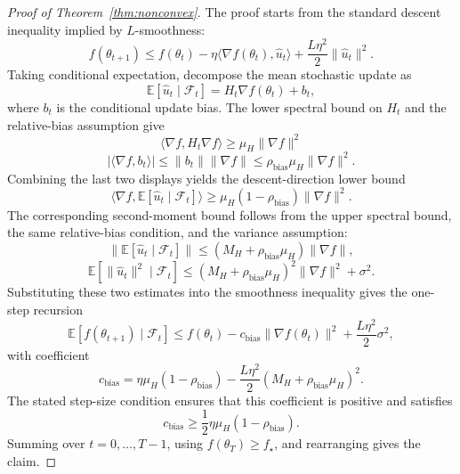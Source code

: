 \documentclass[10pt,a4paper]{amsart}
\newcommand{\E}{\mathbb{E}}
\begin{document}
\begin{proof}[Proof of Theorem~\ref{thm:nonconvex}]
The proof starts from the standard descent inequality implied by $L$-smoothness:
\begin{equation}
    f(\theta_{t+1})
    \le
    f(\theta_t)
    -
    \eta\langle \nabla f(\theta_t),\hat u_t\rangle
    +
    \frac{L\eta^2}{2}\|\hat u_t\|^2.
\end{equation}
Taking conditional expectation, decompose the mean stochastic update as
\begin{equation}
    \E[\hat u_t\mid\mathcal F_t]
    =
    H_t\nabla f(\theta_t)+b_t,
\end{equation}
where $b_t$ is the conditional update bias. The lower spectral bound on $H_t$ and the relative-bias assumption give
\begin{equation}
    \langle \nabla f,H_t\nabla f\rangle
    \ge
    \mu_H\|\nabla f\|^2
\end{equation}
\begin{equation}
    |\langle \nabla f,b_t\rangle|
    \le
    \|b_t\|\|\nabla f\|
    \le
    \rho_{\mathrm{bias}}\mu_H\|\nabla f\|^2.
\end{equation}
Combining the last two displays yields the descent-direction lower bound
\begin{equation}
    \langle \nabla f,\E[\hat u_t\mid\mathcal F_t]\rangle
    \ge
    \mu_H(1-\rho_{\mathrm{bias}})\|\nabla f\|^2.
\end{equation}
The corresponding second-moment bound follows from the upper spectral bound, the same relative-bias condition, and the variance assumption:
\begin{equation}
    \|\E[\hat u_t\mid\mathcal F_t]\|
    \le
    (M_H+\rho_{\mathrm{bias}}\mu_H)\|\nabla f\|,
\end{equation}
\begin{equation}
    \E[\|\hat u_t\|^2\mid\mathcal F_t]
    \le
    (M_H+\rho_{\mathrm{bias}}\mu_H)^2\|\nabla f\|^2+\sigma^2.
\end{equation}
Substituting these two estimates into the smoothness inequality gives the one-step recursion
\begin{equation}
    \E[f(\theta_{t+1})\mid\mathcal F_t]
    \le
    f(\theta_t)
    -
    c_{\mathrm{bias}}\|\nabla f(\theta_t)\|^2
    +
    \frac{L\eta^2}{2}\sigma^2,
\end{equation}
with coefficient
\begin{equation}
    c_{\mathrm{bias}}
    =
    \eta\mu_H(1-\rho_{\mathrm{bias}})
    -
    \frac{L\eta^2}{2}(M_H+\rho_{\mathrm{bias}}\mu_H)^2.
\end{equation}
The stated step-size condition ensures that this coefficient is positive and satisfies
\begin{equation}
    c_{\mathrm{bias}}\ge \frac{1}{2}\eta\mu_H(1-\rho_{\mathrm{bias}}).
\end{equation}
Summing over $t=0,\ldots,T-1$, using $f(\theta_T)\ge f_\star$, and rearranging gives the claim.
\end{proof}
\end{document}
